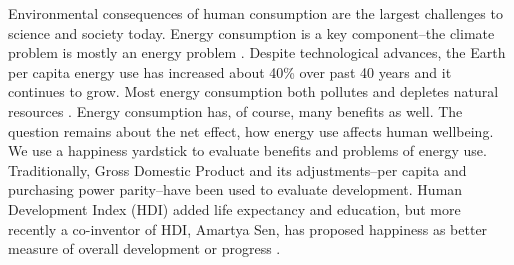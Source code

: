 \documentclass[10pt, letterpaper]{article}
\begin{document}
\begin{spacing}{1.4}




Environmental consequences of human consumption are the largest challenges to
science and society today. Energy consumption is a key component--the climate problem is mostly an energy problem \cite{mackay08}. Despite
technological advances, the Earth per capita energy use has increased about 40\%
over past 40 years and it continues to grow. %
Most energy consumption both pollutes and  depletes natural resources
\cite{arrow04, soytas07}. %
 Energy consumption has, of course, many benefits as well.
 The question remains about the net effect, how energy use affects human wellbeing.
We use a happiness yardstick
to evaluate benefits and problems of energy use. Traditionally, Gross Domestic
Product and its adjustments--per capita and purchasing power parity--have been used to evaluate development. Human Development Index (HDI)
added life expectancy and education, but more recently a co-inventor of HDI,
Amartya Sen, has proposed happiness as better measure of overall development or
progress 
\cite{stiglitz09al}. 


\end{spacing}
\end{document}

